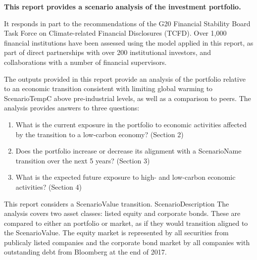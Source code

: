 \documentclass[10pt,table,a4]{article}\usepackage[]{graphicx}\usepackage[]{color}
\begin{document}
	\begin{multicols}{2}
		\textbf{This report provides a scenario analysis of the investment portfolio.} 
		
		It responds in part to the recommendations of the G20 Financial Stability Board Task Force on Climate-related Financial Disclosures (TCFD). Over 1,000 financial institutions have been assessed using the model applied in this report, as part of direct partnerships with over 200 institutional investors, and collaborations with a number of financial supervisors. 
		
		The outputs provided in this report provide an analysis of the portfolio relative to an economic transition consistent with limiting global warming to ScenarioTemp\degree C above pre-industrial levels, as well as a comparison to peers. The analysis provides answers to three questions: 
		
		\begin{enumerate}
			\item{What is the current exposure in the portfolio to economic activities affected by the transition to a low-carbon economy? (Section 2)}
			\item{Does the portfolio increase or decrease its alignment with a ScenarioName transition over the next 5 years? (Section 3)}
			\item{What is the expected future exposure to high- and low-carbon economic activities? (Section 4)}
		\end{enumerate}
		
		This report considers a ScenarioValue transition. ScenarioDescription The analysis covers two asset classes: listed equity and corporate bonds. These are compared to either an portfolio or market, as if they would transition aligned to the ScenarioValue. The equity market is represented by all securities from publicaly listed companies and the corporate bond market by all companies with outstanding debt from Bloomberg at the end of 2017. \columnbreak
		


\end{multicols}
\end{document}
